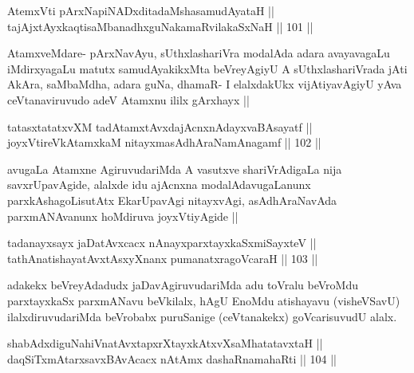 
\begin{shl}
AtemxVti pArxNapiNADxditadaMshasamudAyataH || \\
tajAjxtAyxkaqtisaMbanadhxguNakamaRvilakaSxNaH ||  101 ||  
\end{shl}

\begin{artha}
AtamxveMdare- pArxNavAyu, sUthxlashariVra modalAda adara avayavagaLu iMdirxyagaLu matutx samudAyakikxMta beVreyAgiyU A sUthxlashariVrada jAti AkAra, saMbaMdha, adara guNa, dhamaR- I elalxdakUkx vijAtiyavAgiyU yAva ceVtanaviruvudo adeV Atamxnu ililx gArxhayx ||
\end{artha}


\begin{shl}
tatasxtatatxvXM tadAtamxtAvxdajAcnxnAdayxvaBAsayatf || \\
joyxVtireVkAtamxkaM nitayxmasAdhAraNamAnagamf ||  102 ||  
\end{shl}

\begin{artha}
avugaLa Atamxne AgiruvudariMda A vasutxve shariVrAdigaLa nija savxrUpavAgide, alalxde idu ajAcnxna modalAdavugaLanunx parxkAshagoLisutAtx EkarUpavAgi nitayxvAgi, asAdhAraNavAda parxmANAvanunx hoMdiruva joyxVtiyAgide ||
\end{artha}


\begin{shl}
tadanayxsayx jaDatAvxcacx nAnayxparxtayxkaSxmiSayxteV ||  \\
tathA\s natishayatAvxtAsxyXnanx pumanatxragoVcaraH ||  103 ||  
\end{shl}

\begin{artha}
adakekx beVreyAdadudx jaDavAgiruvudariMda adu toVralu beVroMdu parxtayxkaSx parxmANavu beVkilalx, hAgU EnoMdu atishayavu (visheVSavU) ilalxdiruvudariMda beVrobabx puruSanige (ceVtanakekx) goVcarisuvudU alalx.
\end{artha}

\begin{shl}
shabAdxdiguNahiVnatAvxtapxrXtayxkAtxvXsaMhatatavxtaH || \\
daqSiTxmAtarxsavxBAvAcacx nA\s \s tAmx dashaRnamahaRti ||  104 ||  
\end{shl}


